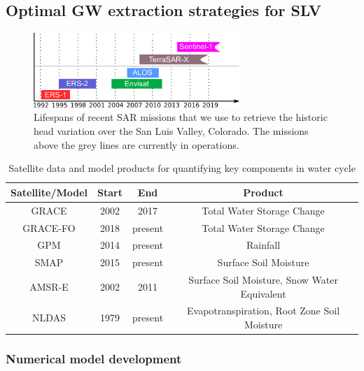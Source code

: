 \documentclass[11pt,final]{article}%
\begin{document}
\subsection{Optimal GW extraction strategies for SLV}\label{sec:proposed optimal}

\begin{figure}
\noindent\includegraphics[width=0.7\textwidth]{Figures/InSARmissions.pdf}
\caption{Lifespans of recent SAR missions that we use to retrieve the historic head variation over the San Luis Valley, Colorado. The missions above the grey lines are currently in operations.}
\label{fig:insar-mission}
\end{figure}

\begin{table}
\caption{Satellite data and model products for quantifying key components in water cycle}
\centering
\begin{tabular}{c c c c }
\hline\hline
Satellite/Model & Start & End  & Product \\[0.5ex]
\hline
GRACE & 2002 & 2017 & Total Water Storage Change \\
GRACE-FO & 2018 & present & Total Water Storage Change \\
GPM & 2014 & present & Rainfall \\
SMAP & 2015& present & Surface Soil Moisture \\
AMSR-E & 2002 & 2011 & Surface Soil Moisture, Snow Water Equivalent \\
NLDAS & 1979 & present & Evapotranspiration, Root Zone Soil Moisture \\[1.0 ex]
\hline
\end{tabular}
\label{tb:data}
\end{table}




\subsubsection{Numerical model development}\label{sec:num_darcy}
\end{document}

